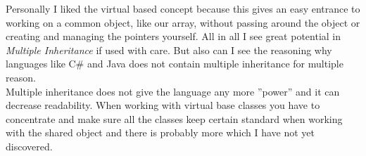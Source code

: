 Personally I liked the virtual based concept because this gives an easy entrance to working on a common object, like our array, without passing around the object or creating and managing the pointers yourself.
All in all I see great potential in \textit{Multiple Inheritance} if used with care. 
But also can I see the reasoning why languages like C\# and Java does not contain multiple inheritance for multiple reason.\\
Multiple inheritance does not give the language any more ''power'' and it can decrease readability. When working with virtual base classes you have to concentrate and make sure all the classes keep certain standard when working with the shared object and there is probably more which I have not yet discovered.
